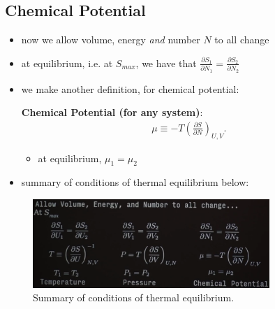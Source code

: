 \documentclass[10pt]{article}
\begin{document}
\subsection{Chemical Potential}
\begin{itemize}
    \item now we allow volume, energy \textit{and} number $N$ to all change
    \item at equilibrium, i.e. at $S_{max}$, we have that $\frac{\partial S_1}{\partial N_1} = \frac{\partial S_2}{\partial N_2}$ 
    \item we make another definition, for chemical potential:
        \begin{definition}
            \textbf{Chemical Potential (for any system)}:
        \begin{gather*}
            \mu \equiv -T \left( \frac{\partial S}{\partial N} \right)_{U,V}
        .\end{gather*}
        \begin{itemize}
            \item at equilibrium, $\mu_1 = \mu_2$
        \end{itemize}
        \end{definition}
    \item summary of conditions of thermal equilibrium below:
\end{itemize}
\begin{figure}[H]
    \centering
    \includegraphics[width=0.8\textwidth]{thermodynamicIdentities.png}
    \caption{Summary of conditions of thermal equilibrium.}
    \label{fig:thermodynamicIdentities}
\end{figure}
\end{document}
